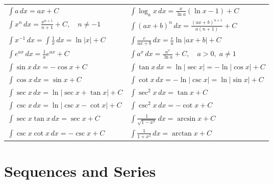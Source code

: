 \documentclass[a4paper,11pt]{article}
\theoremstyle{definition}
\theoremstyle{plain}
\theoremstyle{remark}
\begin{document}
\begin{tcolorbox}[breakable]
    \keepXColumns
    \begin{tabularx}{\textwidth}{X|X}
        $\int a \, dx = ax + C$ &  
        $\int \log_a x \, dx = \frac{x}{\ln{a}} (\ln{x} - 1) + C$ \\[12pt] 

        $\int x^n \, dx = \frac{x^{n+1}}{n+1} + C,\quad n \neq -1$ &
        $\int (ax+b)^n \, dx = \frac{(ax+b)^{n+1}}{a(n+1)} + C$ \\[12pt]
        
        $\int x^{-1} \, dx = \int \frac{1}{x} \, dx = \ln{|x|} + C$ &
        $\int \frac{c}{ax+b} \, dx = \frac{c}{a} \ln{|ax+b|} + C$ \\[12pt] 
        
        $\int e^{ax} \, dx = \frac{1}{a} e^{ax} + C$ &
        $\int a^x \, dx = \frac{a^x}{\ln{a}} + C,\quad a > 0,\; a \neq 1$ \\[12pt]
              
        $\int \sin{x} \, dx = - \cos{x} + C$ &
        $\int \tan{x} \, dx = \ln{|\sec{x}|} = - \ln{|\cos{x}|} + C$ \\[12pt]
              
        $\int \cos{x} \, dx = \sin{x} + C$ &
        $\int \cot{x} \, dx = -\ln{|\csc{x}|} = \ln{|\sin{x}|} + C$ \\[12pt]
        
        $\int \sec{x} \, dx = \ln{|\sec{x} + \tan{x}|} + C$ &
        $\int \sec^2{x} \, dx = \tan{x} + C$ \\[12pt]
        
        $\int \csc{x} \, dx = \ln{|\csc{x} - \cot{x}|} + C$ &
        $\int \csc^2{x} \, dx = -\cot{x} + C$ \\[12pt]
        
        $\int \sec{x} \tan{x} \, dx = \sec{x} + C$ &
        $\int \frac{1}{\sqrt{1-x^2}} \, dx = \arcsin{x} + C$ \\[12pt]
        
        $\int \csc{x} \cot{x} \, dx = -\csc{x} + C$ &
        $\int \frac{1}{1+x^2} \, dx = \arctan{x} + C$ \\[12pt]
    \end{tabularx}
\end{tcolorbox}




\section{Sequences and Series}
\end{document}
